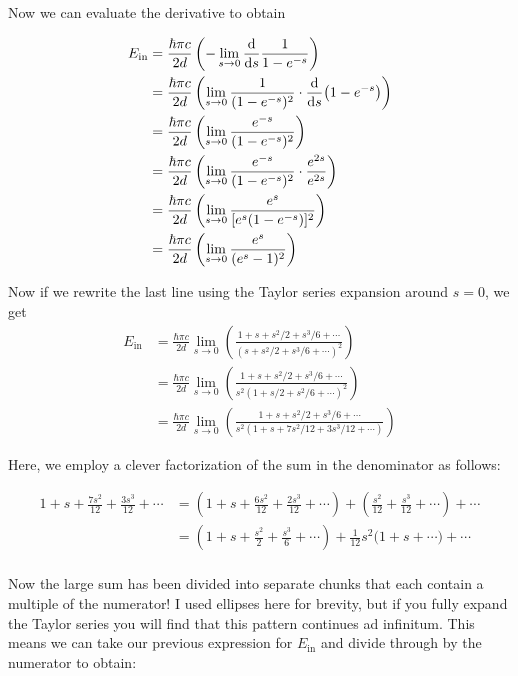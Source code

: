 Now we can evaluate the derivative to obtain

\begin{align*}
	E_{\text{in}} &= \frac{\hbar \pi c}{2d} \left( - \lim\limits_{s \rightarrow 0} \dv{s} \frac{1}{1-e^{-s}} \right) \\
	&= \frac{\hbar \pi c}{2d} \left( \lim\limits_{s \rightarrow 0} \frac{1}{(1-e^{-s})^2} \cdot \dv{s} (1-e^{-s}) \right) \\
	&= \frac{\hbar \pi c}{2d} \left( \lim\limits_{s \rightarrow 0} \frac{e^{-s}}{(1-e^{-s})^2} \right) \\
	&= \frac{\hbar \pi c}{2d} \left( \lim\limits_{s \rightarrow 0} \frac{e^{-s}}{(1-e^{-s})^2} \cdot \frac{e^{2s}}{e^{2s}} \right) \\
	&= \frac{\hbar \pi c}{2d} \left( \lim\limits_{s \rightarrow 0} \frac{e^{s}}{[e^s(1-e^{-s})]^2} \right) \\
	&= \frac{\hbar \pi c}{2d} \left( \lim\limits_{s \rightarrow 0} \frac{e^{s}}{(e^s-1)^2} \right)
\end{align*}

Now if we rewrite the last line using the Taylor series expansion around $s=0$, we get
\begin{align*}
	E_{\text{in}} &= \frac{\hbar \pi c}{2d} \lim\limits_{s \rightarrow 0} \left( \frac{1 + s + s^2/2 + s^3/6 + \cdots}{(s + s^2/2 + s^3/6 + \cdots)^2} \right) \\
	&= \frac{\hbar \pi c}{2d} \lim\limits_{s \rightarrow 0} \left( \frac{1 + s + s^2/2 + s^3/6 + \cdots}{s^2 (1 + s/2 + s^2/6 + \cdots)^2} \right) \\
	&= \frac{\hbar \pi c}{2d} \lim\limits_{s \rightarrow 0} \left( \frac{1 + s + s^2/2 + s^3/6 + \cdots}{s^2 (1 + s + 7s^2/12 + 3s^3/12 + \cdots )} \right) 
\end{align*}

Here, we employ a clever factorization of the sum in the denominator as follows:

\begin{align*}
	1 + s + \frac{7s^2}{12} + \frac{3s^3}{12} + \cdots &= \left( 1 + s + \frac{6s^2}{12} + \frac{2s^3}{12} + \cdots \right) + \left( \frac{s^2}{12} + \frac{s^3}{12} + \cdots \right) + \cdots \\
	&= \left( 1 + s + \frac{s^2}{2} + \frac{s^3}{6} + \cdots \right) + \frac{1}{12}s^2 \bigg( 1 + s + \cdots \bigg) + \cdots \\
\end{align*}

Now the large sum has been divided into separate chunks that each contain a multiple of the numerator! 
I used ellipses here for brevity, but if you fully expand the Taylor series you will find that this pattern continues ad infinitum. 
This means we can take our previous expression for $E_{\text{in}}$ and divide through by the numerator to obtain:

